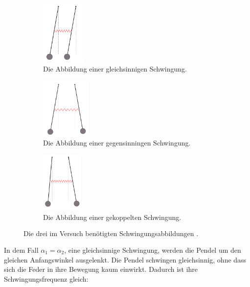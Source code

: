 \begin{figure}[H] 
    \begin{subfigure}{0.50\textwidth}
        \centering
        \includegraphics[width=22mm]{bilder/gleichphase.png}
        \caption{Die Abbildung einer gleichsinnigen Schwingung.} 
        \label{Abbildung1a}
    \end{subfigure}
    \hspace{0.3cm}
    \begin{subfigure}{0.50\textwidth}
        \centering
        \includegraphics[height=30mm]{bilder/gegenphase.png}
        \caption{Die Abbildung einer gegensinningen Schwingung.} 
        \label{Abbildung1b}
    \end{subfigure}
    \center
    \begin{subfigure}{0.60\textwidth}
        \centering
        \includegraphics[height=30mm]{bilder/gekoppelte.png}
        \caption{Die Abbildung einer gekoppelten Schwingung.} 
        \label{Abbildung1c}
    \end{subfigure}
    \caption{Die drei im Versuch benötigten Schwingungsabbildungen \cite[2]{aa1}.}
    \label{Abbildung1}
\end{figure}

\begin{flushleft}
    In dem Fall $ \alpha_1 = \alpha_2 $, eine gleichsinnige Schwingung, werden die Pendel um den gleichen Anfangswinkel ausgelenkt.
    Die Pendel schwingen gleichsinnig, ohne dass sich die Feder in ihre Bewegung kaum einwirkt. 
    Dadurch ist ihre Schwingungsfrequenz gleich: 
\end{flushleft}

